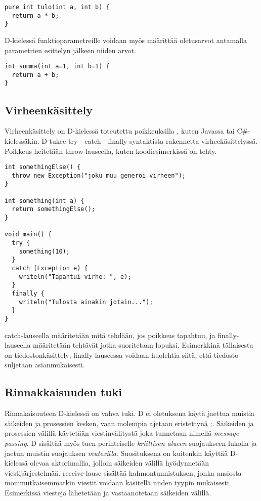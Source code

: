 \documentclass[11pt,oneside,a4paper]{article}
\begin{document}
\begin{verbatim}
pure int tulo(int a, int b) {
  return a * b;
}
\end{verbatim}

D-kielessä funktioparametreille voidaan myös määrittää oletusarvot antamalla
parametrien esittelyn jälkeen niiden arvot.
\begin{verbatim}
int summa(int a=1, int b=1) {
  return a + b;
}
\end{verbatim}

\subsection{Virheenkäsittely}
Virheenkäsittely on D-kielessä toteutettu poikkeuksilla \cite{ALE10}, kuten
Javassa tai C\#-kielessäkin. D tukee try - catch - finally syntaktista
rakennetta virheekäsittelyssä. Poikkeus heitetään throw-lauseella, kuten
koodiesimerkissä on tehty.

\begin{verbatim}
int somethingElse() {
  throw new Exception("joku muu generoi virheen");
}

int something(int a) {
  return somethingElse();
}

void main() {
  try {
    something(10);
  }
  catch (Exception e) {
    writeln("Tapahtui virhe: ", e);
  }
  finally {
    writeln("Tulosta ainakin jotain...");
  }
}
\end{verbatim}

catch-lauseella määritetään mitä tehdään, jos poikkeus tapahtuu, ja
finally-lauseella määritetään tehtävät jotka suoritetaan lopuksi. Esimerkkinä
tällaisesta on tiedostonkäsittely; finally-lauseessa voidaan huolehtia siitä,
että tiedosto suljetaan asianmukaisesti.

\subsection{Rinnakkaisuuden tuki}
Rinnakaisuuteen D-kielessä on vahva tuki. D ei oletuksena käytä jaettua muistia
säikeiden ja prosessien kesken, vaan molempia ajetaan eristettynä
\cite{DLA13};\cite{ALE10}. Säikeiden ja prosessien välillä käytetään
viestinvälitystä joka tunnetaan nimellä \textit{message passing}. D sisältää
myös tuen perinteiselle \textit{kriittisen alueen} suojaukseen lukolla ja jaetun
muistin suojauksen \textit{mutexilla}. Suosituksena on kuitenkin käyttää
D-kielessä olevaa aktorimallia, jolloin säikeiden välillä hyödynnetään
viestijärjestelmää. receive-lause sisältää hahmontunnistuksen, jonka ansiosta
monimutkaisemmatkin viestit voidaan käsitellä niiden tyypin mukaisesti.
Esimerkissä viestejä lähetetään ja vastaanotetaan säikeiden välillä.
\end{document}
